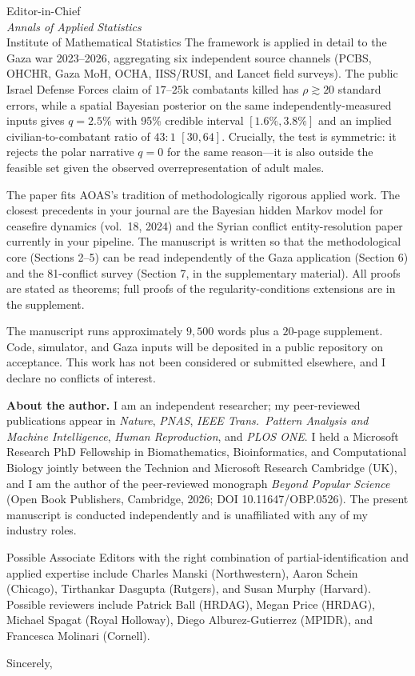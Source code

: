 \documentclass[11pt]{letter}
\begin{document}
\begin{letter}{Editor-in-Chief\\ \emph{Annals of Applied Statistics}\\ Institute of Mathematical Statistics}
The framework is applied in detail to the Gaza war 2023--2026, aggregating six independent source channels (PCBS, OHCHR, Gaza MoH, OCHA, IISS/RUSI, and Lancet field surveys). The public Israel Defense Forces claim of $17$--$25$k combatants killed has $\rho\gtrsim 20$ standard errors, while a spatial Bayesian posterior on the same independently-measured inputs gives $q=2.5\%$ with 95\% credible interval $[1.6\%,3.8\%]$ and an implied civilian-to-combatant ratio of $43{:}1$ \mbox{$[30,64]$}. Crucially, the test is symmetric: it rejects the polar narrative $q=0$ for the same reason---it is also outside the feasible set given the observed overrepresentation of adult males.

The paper fits AOAS's tradition of methodologically rigorous applied work. The closest precedents in your journal are the Bayesian hidden Markov model for ceasefire dynamics (vol.~18, 2024) and the Syrian conflict entity-resolution paper currently in your pipeline. The manuscript is written so that the methodological core (Sections 2--5) can be read independently of the Gaza application (Section 6) and the 81-conflict survey (Section 7, in the supplementary material). All proofs are stated as theorems; full proofs of the regularity-conditions extensions are in the supplement.

The manuscript runs approximately $9{,}500$ words plus a $20$-page supplement. Code, simulator, and Gaza inputs will be deposited in a public repository on acceptance. This work has not been considered or submitted elsewhere, and I declare no conflicts of interest.

\textbf{About the author.} I am an independent researcher; my peer-reviewed publications appear in \emph{Nature}, \emph{PNAS}, \emph{IEEE Trans.\ Pattern Analysis and Machine Intelligence}, \emph{Human Reproduction}, and \emph{PLOS ONE}. I held a Microsoft Research PhD Fellowship in Biomathematics, Bioinformatics, and Computational Biology jointly between the Technion and Microsoft Research Cambridge (UK), and I am the author of the peer-reviewed monograph \emph{Beyond Popular Science} (Open Book Publishers, Cambridge, 2026; DOI 10.11647/OBP.0526). The present manuscript is conducted independently and is unaffiliated with any of my industry roles.

Possible Associate Editors with the right combination of partial-identification and applied expertise include Charles Manski (Northwestern), Aaron Schein (Chicago), Tirthankar Dasgupta (Rutgers), and Susan Murphy (Harvard). Possible reviewers include Patrick Ball (HRDAG), Megan Price (HRDAG), Michael Spagat (Royal Holloway), Diego Alburez-Gutierrez (MPIDR), and Francesca Molinari (Cornell).

\closing{Sincerely,}

\end{letter}
\end{document}
